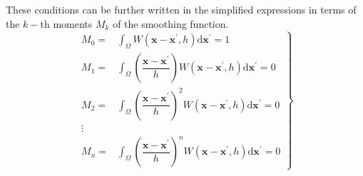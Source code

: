 \documentclass[letterpaper,12pt]{article}
\numberwithin{equation}{section}
\begin{document}
These conditions can be further written in the simplified expressions in terms of the $k-$th moments $M_k$ of the smoothing function.
\begin{equation}
    \left.
    \begin{aligned}
        M_0 =& \int_{\Omega} W(\mathbf{x} - \mathbf{x}^\prime, h) \mathrm{d} \mathbf{x}^\prime = 1 \\
        M_1 =& \int_{\Omega} \left( \dfrac{\mathbf{x} - \mathbf{x}^\prime}{h} \right) W(\mathbf{x} - \mathbf{x}^\prime, h) \mathrm{d} \mathbf{x}^\prime = 0 \\
        M_2 =& \int_{\Omega} \left( \dfrac{\mathbf{x} - \mathbf{x}^\prime}{h} \right)^2 W(\mathbf{x} - \mathbf{x}^\prime, h) \mathrm{d} \mathbf{x}^\prime = 0 \\
        \vdots & \\
        M_n =& \int_{\Omega} \left( \dfrac{\mathbf{x} - \mathbf{x}^\prime}{h} \right)^n W(\mathbf{x} - \mathbf{x}^\prime, h) \mathrm{d} \mathbf{x}^\prime = 0
    \end{aligned}
    \right\}
\end{equation}
\end{document}
